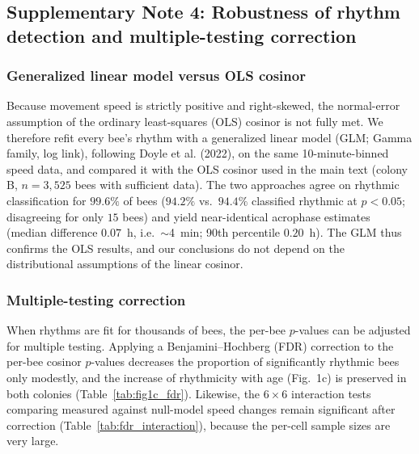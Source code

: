 \documentclass{article}
\newcommand{\added}[1]{{\color{blue}#1}}
\newcommand{\added}[1]{#1}
\begin{document}
\clearpage

\subsection{\added{Supplementary Note 4: Robustness of rhythm detection and multiple-testing correction}}

\added{
\subsubsection*{Generalized linear model versus OLS cosinor}
Because movement speed is strictly positive and right-skewed, the normal-error assumption of the
ordinary least-squares (OLS) cosinor is not fully met. We therefore refit every bee's rhythm with a
generalized linear model (GLM; Gamma family, log link), following Doyle et al. (2022),
on the same 10-minute-binned speed data, and compared it with the OLS cosinor used in the main text
(colony B, $n = 3{,}525$ bees with sufficient data). The two approaches agree on rhythmic classification
for $99.6\%$ of bees ($94.2\%$ vs.\ $94.4\%$ classified rhythmic at $p < 0.05$; disagreeing for only
$15$ bees) and yield near-identical acrophase estimates (median difference $0.07$~h, i.e.\ $\sim$4~min;
90th percentile $0.20$~h). The GLM thus confirms the OLS results, and our conclusions do not depend on
the distributional assumptions of the linear cosinor.

\subsubsection*{Multiple-testing correction}
When rhythms are fit for thousands of bees, the per-bee $p$-values can be adjusted for multiple testing.
Applying a Benjamini--Hochberg (FDR) correction to the per-bee cosinor $p$-values decreases the
proportion of significantly rhythmic bees only modestly, and the increase of rhythmicity with age
(Fig.~1c) is preserved in both colonies (Table~\ref{tab:fig1c_fdr}). Likewise, the $6\times6$ interaction
tests comparing measured against null-model speed changes remain significant after correction
(Table~\ref{tab:fdr_interaction}), because the per-cell sample sizes are very large.
}
\end{document}
